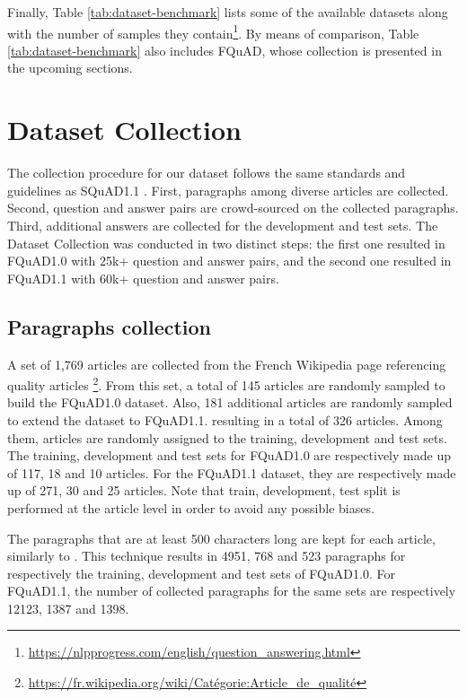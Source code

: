 \documentclass{article}
\begin{document}
Finally, Table \ref{tab:dataset-benchmark} lists some of the available datasets along with the number of samples they contain\footnote{\url{https://nlpprogress.com/english/question_answering.html}}. 
By means of comparison, Table \ref{tab:dataset-benchmark} also includes FQuAD, whose collection is presented in the upcoming sections. 



 


\section{Dataset Collection}
\label{section:dataset_collection}
The collection procedure for our dataset follows the same standards and guidelines as SQuAD1.1 \citep{rajpurkar-etal-2016-squad}.
First, paragraphs among diverse articles are collected.
Second, question and answer pairs are crowd-sourced on the collected paragraphs.
Third, additional answers are collected for the development and test sets.
The Dataset Collection was conducted in two distinct steps: the first one resulted in FQuAD1.0 with 25k+ question and answer pairs, and the second one resulted in FQuAD1.1 with 60k+ question and answer pairs.

\subsection{Paragraphs collection}

A set of 1,769 articles are collected from the French Wikipedia page referencing quality articles \footnote{\url{https://fr.wikipedia.org/wiki/Catégorie:Article_de_qualité}}.
From this set, a total of 145 articles are randomly sampled to build the FQuAD1.0 dataset.
Also, 181 additional articles are randomly sampled to extend the dataset to FQuAD1.1. resulting in a total of 326 articles.
Among them, articles are randomly assigned to the training, development and test sets.
The training, development and test sets for FQuAD1.0 are respectively made up of 117, 18 and 10 articles.
For the FQuAD1.1 dataset, they are respectively made up of 271, 30 and 25 articles.
Note that train, development, test split is performed at the article level in order to avoid any possible biases.

The paragraphs that are at least 500 characters long are kept for each article, similarly to \citep{rajpurkar-etal-2016-squad}.
This technique results in 4951, 768 and 523 paragraphs for respectively the training, development and test sets of FQuAD1.0.
For FQuAD1.1, the number of collected paragraphs for the same sets are respectively 12123, 1387 and 1398.
\end{document}
